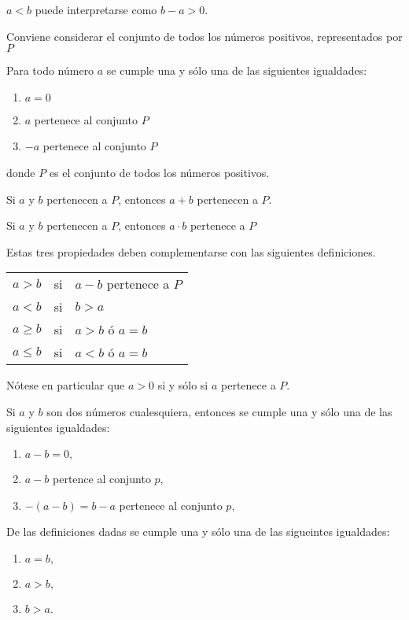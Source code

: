 \begin{def.}
$a<b$ puede interpretarse como $b-a>0$.
\end{def.}

Conviene considerar el conjunto de todos los números positivos, representados por $P$\\

\begin{prop} Para todo número $a$ se cumple una y sólo una de las siguientes igualdades:
\begin{enumerate}[\bfseries (i)]
\item $a=0$
\item $a$ pertenece al conjunto $P$
\item $-a$ pertenece al conjunto $P$
\end{enumerate}

donde $P$ es el conjunto de todos los números positivos.
\end{prop}

\begin{prop} Si $a$ y $b$ pertenecen a $P$, entonces $a+b$ pertenecen a $P$.
\end{prop}

\begin{prop} Si $a$ y $b$ pertenecen a $P$, entonces $a\cdot b$ pertenece a $P$
\end{prop}

\begin{def.} Estas tres propiedades deben complementarse con las siguientes definiciones.
\begin{center}
\begin{tabular}{rcl}
$a>b$&si&$a-b$ pertenece a $P$\\
$a<b$&si&$b>a$\\
$a\geq b $&si&$a>b$ ó $a=b$\\
$a\leq b$&si&$a<b$ ó $a=b$\\
\end{tabular}
\end{center}
Nótese en particular que $a>0$ si y sólo si $a$ pertenece a $P$.
\end{def.}
\vspace{.2cm}
Si $a$ y $b$ son dos números cualesquiera, entonces se cumple una y sólo una de las siguientes igualdades:
\begin{enumerate}[\bfseries i)]
\item $a-b=0,$
\item $a-b$ pertence al conjunto $p,$
\item $-(a-b) = b-a$ pertenece al conjunto $p,$
\end{enumerate}
De las definiciones dadas se cumple una y sólo una de las sigueintes igualdades:
\begin{enumerate}[\bfseries i)]
\item $a=b,$
\item  $a>b,$
\item $b>a.$
\end{enumerate}

